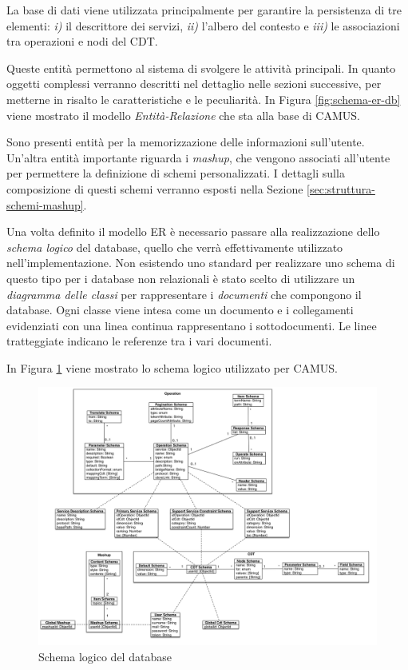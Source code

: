 La base di dati viene utilizzata principalmente per garantire la persistenza di tre elementi: \emph{i)} il descrittore dei servizi, \emph{ii)} l'albero del contesto e \emph{iii)} le associazioni tra operazioni e nodi del CDT.

Queste entità permettono al sistema di svolgere le attività principali. In quanto oggetti complessi verranno descritti nel dettaglio nelle sezioni successive, per metterne in risalto le caratteristiche e le peculiarità. In Figura \ref{fig:schema-er-db} viene mostrato il modello \emph{Entità-Relazione} che sta alla base di CAMUS.

Sono presenti entità per la memorizzazione delle informazioni sull'u\-ten\-te. Un'al\-tra entità importante riguarda i \emph{mashup}, che vengono associati all'utente per permettere la definizione di schemi personalizzati. I dettagli sulla composizione di questi schemi verranno esposti nella Sezione \ref{sec:struttura-schemi-mashup}.

Una volta definito il modello ER è necessario passare alla realizzazione dello \emph{schema logico} del database, quello che verrà effettivamente utilizzato nell'im\-ple\-men\-ta\-zio\-ne. Non esistendo uno standard per realizzare uno schema di questo tipo per i database non relazionali è stato scelto di utilizzare un \emph{diagramma delle classi} per rappresentare i \emph{documenti} che compongono il database. Ogni classe viene intesa come un documento e i collegamenti evidenziati con una linea continua rappresentano i sottodocumenti. Le linee tratteggiate indicano le referenze tra i vari documenti.

In Figura \ref{fig:schema-logico-db} viene mostrato lo schema logico utilizzato per CAMUS.

\begin{figure}[!b]
	\centering
	\includegraphics[width=\textwidth]{5-implementazione-backend/Immagini/schema_logico_db.png}
	\caption{Schema logico del database}\label{fig:schema-logico-db}
\end{figure}

